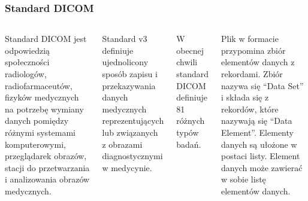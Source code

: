 \documentclass[aspectratio=169]{beamer}
\begin{document}
\begin{frame}[t]
    \frametitle{Standard DICOM}
    \begin{columns}[t]

        \scriptsize
        \vspace{-7em}
        Standard DICOM jest odpowiedzią społeczności radiologów, radiofarmaceutów, fizyków medycznych na potrzebę wymiany danych pomiędzy różnymi systemami komputerowymi, przeglądarek obrazów, stacji do przetwarzania i analizowania obrazów medycznych.

        \vspace{1em}
        Standard \DICOM v3 definiuje ujednolicony sposób zapisu i przekazywania danych medycznych reprezentujących lub związanych z obrazami diagnostycznymi w medycynie.

        \vspace{1em}
        W obecnej chwili standard DICOM definiuje 81 różnych typów badań.

        \vspace{1em}
        Plik w formacie \DICOM przypomina zbiór elementów danych z rekordami.
        Zbiór nazywa się \enquote{Data Set} i składa się z rekordów, które nazywają się \enquote{Data Element}.
        Elementy danych są ułożone w postaci listy.
        Element danych może zawierać w sobie listę elementów danych.


\end{columns}
\end{frame}
\end{document}
